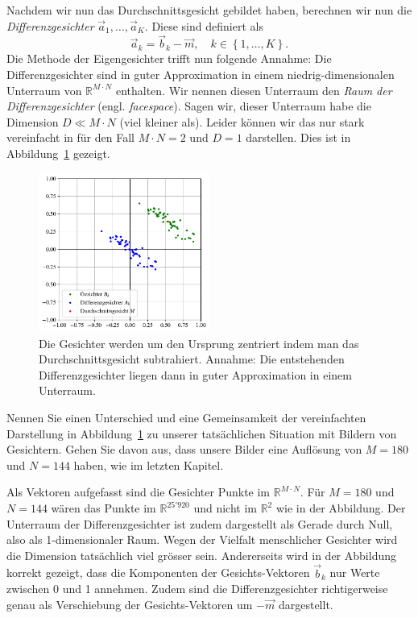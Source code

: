 Nachdem wir nun das Durchschnittsgesicht gebildet haben, berechnen wir nun die \textit{Differenzgesichter} $\vec a_1,\ldots,\vec a_K$.
Diese sind definiert als
\begin{equation*}
	\vec a_k=\vec b_k-\vec m,\quad k\in\left\{1,\ldots,K\right\}.
\end{equation*}
Die Methode der Eigengesichter trifft nun folgende Annahme:
Die Differenzgesichter sind in guter Approximation in einem niedrig-dimensionalen Unterraum von $\mathbb R^{M\cdot N}$ enthalten.
Wir nennen diesen Unterraum den \textit{Raum der Differenzgesichter} (engl. \textit{facespace}).
Sagen wir, dieser Unterraum habe die Dimension $D\ll M\cdot N$ (\glqq{}viel kleiner als\grqq{}).
Leider können wir das nur stark vereinfacht in für den Fall $M\cdot N=2$ und $D=1$ darstellen.
Dies ist in Abbildung~\ref{fig:meandiff} gezeigt.
\begin{figure}[ht]
	\centering
	\includegraphics[width=0.5\textwidth]{images/facespace/meandiff}
	\caption{Die Gesichter werden um den Ursprung zentriert indem man das Durchschnittsgesicht subtrahiert.
	Annahme: Die entstehenden Differenzgesichter liegen dann in guter Approximation in einem Unterraum.}
	\label{fig:meandiff}
\end{figure}
\begin{aufgabe}
	Nennen Sie einen Unterschied und eine Gemeinsamkeit der vereinfachten Darstellung in Abbildung~\ref{fig:meandiff} zu unserer tatsächlichen Situation mit Bildern von Gesichtern.
	Gehen Sie davon aus, dass unsere Bilder eine Auflösung von $M=180$ und $N=144$ haben, wie im letzten Kapitel.
\end{aufgabe}
\begin{losung*}
	Als Vektoren aufgefasst sind die Gesichter Punkte im $\mathbb R^{M\cdot N}$.
	Für $M=180$ und $N=144$ wären das Punkte im $\mathbb R^{25'920}$ und nicht im $\mathbb R^2$ wie in der Abbildung.
	Der Unterraum der Differenzgesichter ist zudem dargestellt als Gerade durch Null, also als 1-dimensionaler Raum.
	Wegen der Vielfalt menschlicher Gesichter wird die Dimension tatsächlich viel grösser sein.
	Andererseits wird in der Abbildung korrekt gezeigt, dass die Komponenten der Gesichts-Vektoren $\vec b_k$ nur Werte zwischen 0 und 1 annehmen.
	Zudem sind die Differenzgesichter richtigerweise genau als Verschiebung der Gesichts-Vektoren um $-\vec m$ dargestellt.
\end{losung*}